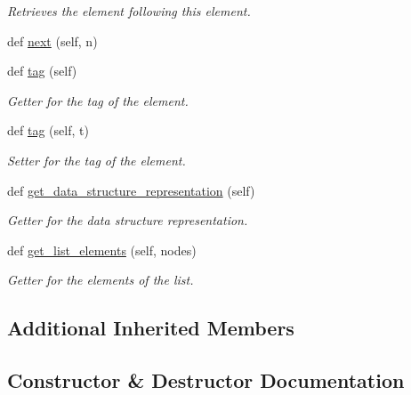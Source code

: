 \begin{DoxyCompactItemize}
\begin{DoxyCompactList}\small\item\em Retrieves the element following this element. \end{DoxyCompactList}\item 
def \hyperlink{classbridges_1_1ml__element_1_1_m_lelement_a588b700bb42eb43ce3993f9715497deb}{next} (self, n)
\item 
def \hyperlink{classbridges_1_1ml__element_1_1_m_lelement_a805f6b6f24ec9c5518c298320742a8d6}{tag} (self)
\begin{DoxyCompactList}\small\item\em Getter for the tag of the element. \end{DoxyCompactList}\item 
def \hyperlink{classbridges_1_1ml__element_1_1_m_lelement_aaae13135b666038dee8a843cd32b03b1}{tag} (self, t)
\begin{DoxyCompactList}\small\item\em Setter for the tag of the element. \end{DoxyCompactList}\item 
def \hyperlink{classbridges_1_1ml__element_1_1_m_lelement_a7d176b966746a889f9234d4a76b99c0c}{get\+\_\+data\+\_\+structure\+\_\+representation} (self)
\begin{DoxyCompactList}\small\item\em Getter for the data structure representation. \end{DoxyCompactList}\item 
def \hyperlink{classbridges_1_1ml__element_1_1_m_lelement_a3996cd2cec7c3978437392eba2ef66eb}{get\+\_\+list\+\_\+elements} (self, nodes)
\begin{DoxyCompactList}\small\item\em Getter for the elements of the list. \end{DoxyCompactList}\end{DoxyCompactItemize}
\subsection*{Additional Inherited Members}


\subsection{Constructor \& Destructor Documentation}
\mbox{\label{classbridges_1_1ml__element_1_1_m_lelement_ae0242b9e3f2d7d7ccc702ef0bc7a61ba}} 
